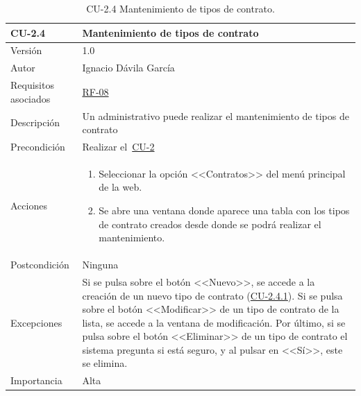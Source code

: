 \begin{table}[p]
	\centering
	\begin{tabularx}{\linewidth}{ p{} p{} }
		\toprule
		\textbf{CU-2.4}    & \textbf{Mantenimiento de tipos de contrato}\\
		\toprule
		{\small Versión}              & 1.0    \\
		{\small Autor}                & Ignacio Dávila García \\
		{\small Requisitos asociados} & \hyperref[itm:RF8]{RF-08} \\
		{\small Descripción}          & Un administrativo puede realizar el mantenimiento de tipos de contrato \\
		{\small Precondición}         & Realizar el~\hyperref[table:CU-2]{CU-2} \\
		{\small Acciones}             &
		\begin{enumerate}
			\def\labelenumi{\arabic{enumi}.}
			\tightlist
			\item Seleccionar la opción <<Contratos>> del menú principal de la web.
			\item Se abre una ventana donde aparece una tabla con los tipos de contrato creados desde donde se podrá realizar el mantenimiento.
		\end{enumerate}\\
		{\small Postcondición}        & Ninguna \\
		{\small Excepciones}          & Si se pulsa sobre el botón <<Nuevo>>, se accede a la creación de un nuevo tipo de contrato (\hyperref[table:CU-2_4_1]{CU-2.4.1}). Si se pulsa sobre el botón <<Modificar>> de un tipo de contrato de la lista, se accede a la ventana de modificación. Por último, si se pulsa sobre el botón <<Eliminar>> de un tipo de contrato el sistema pregunta si está seguro, y al pulsar en <<Sí>>, este se elimina. \\
		{\small Importancia}          & Alta \\
		\bottomrule
	\end{tabularx}
	\caption{CU-2.4 Mantenimiento de tipos de contrato.}\label{table:CU-2_4}
\end{table}
\FloatBarrier

